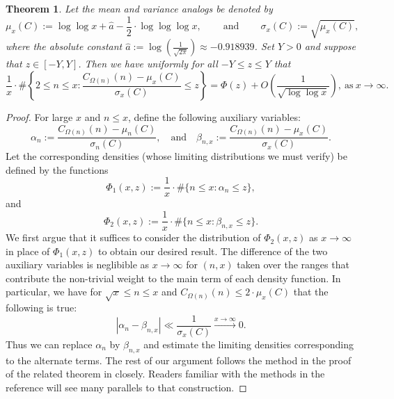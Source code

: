 \documentclass[11pt,reqno,a4letter]{article}
\numberwithin{figure}{section}
\numberwithin{table}{section}
\theoremstyle{plain}
\newtheorem{theorem}{Theorem}
\numberwithin{theorem}{section}
\theoremstyle{definition}
\begin{document}
\begin{theorem} 
\label{theorem_CLT_VI} 
Let the mean and variance analogs be denoted by 
\[
\mu_x(C) := \log\log x + \hat{a} - \frac{1}{2} \cdot \log\log\log x, 
     \qquad \mathrm{\ and\ } \qquad 
     \sigma_x(C) := \sqrt{\mu_x(C)}, 
\]
where the absolute constant 
$\hat{a} := \log\left(\frac{1}{\sqrt{2\pi}}\right) \approx -0.918939$. 
Set $Y > 0$ and suppose that $z \in [-Y, Y]$. Then we have 
uniformly for all $-Y \leq z \leq Y$ that 
\[
\frac{1}{x} \cdot \#\left\{2 \leq n \leq x: 
     \frac{C_{\Omega(n)}(n) - \mu_x(C)}{\sigma_x(C)} \leq z\right\} = 
     \Phi(z) + O\left(\frac{1}{\sqrt{\log\log x}}\right), 
     \mathrm{\ as\ } x \rightarrow \infty. 
\] 
\end{theorem} 
\begin{proof} 
For large $x$ and $n \leq x$, define the following auxiliary variables: 
\[
\alpha_n := \frac{C_{\Omega(n)}(n) - \mu_n(C)}{\sigma_n(C)}, \quad\mathrm{and}\quad 
     \beta_{n,x} := \frac{C_{\Omega(n)}(n) - \mu_x(C)}{\sigma_x(C)}. 
\] 
Let the corresponding densities (whose limiting distributions we must verify) 
be defined by the functions 
\[
\Phi_1(x, z) := \frac{1}{x} \cdot \#\{n \leq x: \alpha_n \leq z\}, 
\]
and 
\[
\Phi_2(x, z) := \frac{1}{x} \cdot \#\{n \leq x: \beta_{n,x} \leq z\}. 
\] 
We first argue that it suffices to consider the distribution of $\Phi_2(x, z)$ as 
$x \rightarrow \infty$ in place of $\Phi_1(x, z)$ to obtain our desired result. 
The difference of the two auxiliary variables is neglibible as 
$x \rightarrow \infty$ for $(n,x)$ taken over the ranges that contribute the non-trivial 
weight to the main term of each density function. In particular, we have for 
$\sqrt{x} \leq n \leq x$ and $C_{\Omega(n)}(n) \leq 2 \cdot \mu_x(C)$ that the 
following is true: 
\[
|\alpha_n - \beta_{n,x}| \ll \frac{1}{\sigma_x(C)} \xrightarrow{x \rightarrow \infty} 0. 
\]
Thus we can replace $\alpha_n$ by $\beta_{n,x}$ and estimate the limiting 
densities corresponding to the alternate terms. 
The rest of our argument follows the method in the proof of the related theorem in 
\cite[Thm.\ 7.21; \S 7.4]{MV} closely. Readers familiar with the methods in the 
reference will see many parallels to that construction. 


\end{proof}
\end{document}

